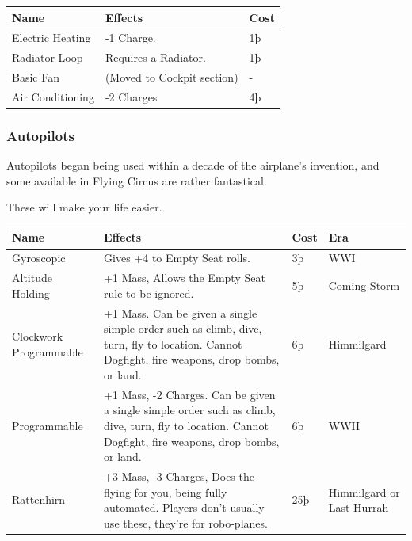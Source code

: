 \documentclass{article}
\begin{document}
\begin{tabular}{|l|l|l|}
    \hline
    Name             & Effects                    & Cost \\\hline
    Electric Heating & -1 Charge.                 & 1þ   \\\hline
    Radiator Loop    & Requires a Radiator.       & 1þ   \\\hline
    Basic Fan        & (Moved to Cockpit section) & -    \\\hline
    Air Conditioning & -2 Charges                 & 4þ   \\\hline
\end{tabular}

\subsubsection{Autopilots}
\label{_Autopilots}

Autopilots began being used within a decade of the airplane's invention,
and some available in Flying Circus are rather fantastical.

These will make your life easier.

\begin{tabular}{|l|l|l|l|}
    \hline
    Name                                                                 & Effects                                                   & Cost       & Era \\\hline
    Gyroscopic                                                           & Gives +4 to Empty Seat rolls.                             & 3þ         & WWI \\\hline
    Altitude Holding                                                     & +1 Mass, Allows the Empty Seat rule to be ignored.        &
    5þ                                                                   & Coming Storm                                                                 \\\hline
    Clockwork Programmable                                               & +1 Mass. Can be given a single simple order
    such as climb, dive, turn, fly to location. Cannot Dogfight, fire
    weapons, drop bombs, or land.                                        & 6þ                                                        & Himmilgard       \\\hline
    Programmable                                                         & +1 Mass, -2 Charges. Can be given a single simple order
    such as climb, dive, turn, fly to location. Cannot Dogfight, fire
    weapons, drop bombs, or land.                                        & 6þ                                                        & WWII             \\\hline
    Rattenhirn                                                           & +3 Mass, -3 Charges, Does the flying for you, being fully
    automated. Players don't usually use these, they're for robo-planes. &
    25þ                                                                  & Himmilgard or Last Hurrah                                                    \\\hline
\end{tabular}
\end{document}
